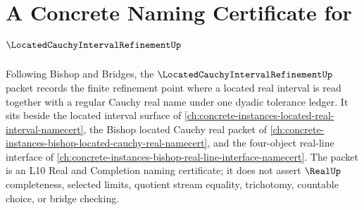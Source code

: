 \chapter{A Concrete Naming Certificate for $\LocatedCauchyIntervalRefinementUp$}
\label{ch:concrete-instances-located-cauchy-interval-refinement-namecert}

Following Bishop and Bridges, the $\LocatedCauchyIntervalRefinementUp$ packet records the finite refinement point where a located real interval is read together with a regular Cauchy real name under one dyadic tolerance ledger. It sits beside the located interval surface of \autoref{ch:concrete-instances-located-real-interval-namecert}, the Bishop located Cauchy real packet of \autoref{ch:concrete-instances-bishop-located-cauchy-real-namecert}, and the four-object real-line interface of \autoref{ch:concrete-instances-bishop-real-line-interface-namecert}. The packet is an L10 Real and Completion naming certificate; it does not assert $\RealUp$ completeness, selected limits, quotient stream equality, trichotomy, countable choice, or bridge checking.

